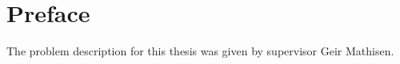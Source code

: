 \chapter*{Preface}
The problem description for this thesis was given by supervisor Geir Mathisen. 


